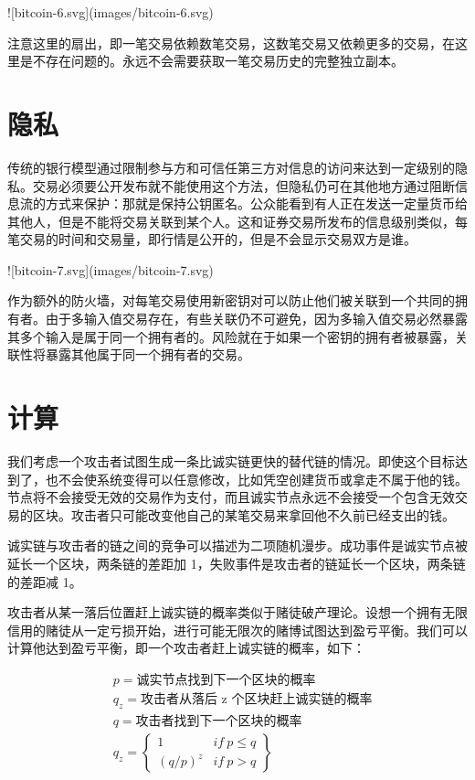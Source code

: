 \documentclass{article}
\begin{document}
![bitcoin-6.svg](images/bitcoin-6.svg)

注意这里的扇出，即一笔交易依赖数笔交易，这数笔交易又依赖更多的交易，在这里是不存在问题的。永远不会需要获取一笔交易历史的完整独立副本。

\section{隐私}
传统的银行模型通过限制参与方和可信任第三方对信息的访问来达到一定级别的隐私。交易必须要公开发布就不能使用这个方法，但隐私仍可在其他地方通过阻断信息流的方式来保护：那就是保持公钥匿名。公众能看到有人正在发送一定量货币给其他人，但是不能将交易关联到某个人。这和证券交易所发布的信息级别类似，每笔交易的时间和交易量，即行情是公开的，但是不会显示交易双方是谁。

![bitcoin-7.svg](images/bitcoin-7.svg)

作为额外的防火墙，对每笔交易使用新密钥对可以防止他们被关联到一个共同的拥有者。由于多输入值交易存在，有些关联仍不可避免，因为多输入值交易必然暴露其多个输入是属于同一个拥有者的。风险就在于如果一个密钥的拥有者被暴露，关联性将暴露其他属于同一个拥有者的交易。

\section{计算}

我们考虑一个攻击者试图生成一条比诚实链更快的替代链的情况。即使这个目标达到了，也不会使系统变得可以任意修改，比如凭空创建货币或拿走不属于他的钱。节点将不会接受无效的交易作为支付，而且诚实节点永远不会接受一个包含无效交易的区块。攻击者只可能改变他自己的某笔交易来拿回他不久前已经支出的钱。

诚实链与攻击者的链之间的竞争可以描述为二项随机漫步。成功事件是诚实节点被延长一个区块，两条链的差距加 1，失败事件是攻击者的链延长一个区块，两条链的差距减 1。

攻击者从某一落后位置赶上诚实链的概率类似于赌徒破产理论。设想一个拥有无限信用的赌徒从一定亏损开始，进行可能无限次的赌博试图达到盈亏平衡。我们可以计算他达到盈亏平衡，即一个攻击者赶上诚实链的概率，如下\cite{Feller}：

\begin{align*}
  & p = \text{诚实节点找到下一个区块的概率}            \\
  & q_z = \text{攻击者从落后 z 个区块赶上诚实链的概率} \\
  & q = \text{攻击者找到下一个区块的概率}              \\
  & q_z =                                              
 \begin{Bmatrix}
  1         & if \ p \leq q \\
  (q / p)^z & if \ p > q    
 \end{Bmatrix}
\end{align*}
\end{document}
